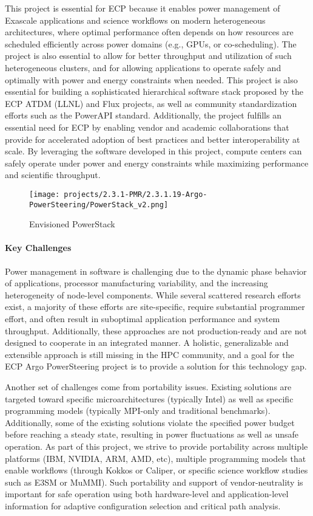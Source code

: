 This project is essential for ECP because it enables power management of Exascale applications and science workflows on modern heterogeneous architectures, where optimal performance often depends on how resources are scheduled efficiently across power domains (e.g., GPUs, or co-scheduling). The project is also essential to allow for better throughput and utilization of such heterogeneous clusters, and for allowing applications to operate safely and optimally with power and energy constraints when needed. This project is also essential for building a sophisticated hierarchical software stack proposed by the ECP ATDM (LLNL) and Flux projects, as well as community standardization efforts such as the PowerAPI standard. Additionally, the project fulfills an essential need for ECP by enabling vendor and academic collaborations that provide for accelerated adoption of best practices and better interoperability at scale. By leveraging the software developed in this project, compute centers can safely operate under power and energy constraints while maximizing performance and scientific throughput. 

\begin{figure}[t]
	\centering
	\texttt{[image: projects/2.3.1-PMR/2.3.1.19-Argo-PowerSteering/PowerStack\_v2.png]}
	\caption{Envisioned PowerStack}
	\label{fig:pstack}
\end{figure}


\paragraph{Key Challenges}
Power management in software is challenging due to the dynamic phase behavior of applications, processor manufacturing variability, and the increasing heterogeneity of node-level components. While several scattered research efforts exist, a majority of these efforts are site-specific, require substantial programmer effort, and often result in suboptimal application performance and system throughput. Additionally, these approaches are not production-ready and are not designed to cooperate in an integrated manner. A holistic, generalizable and extensible approach is still missing in the HPC community, and a goal for the ECP Argo PowerSteering project is to provide a solution for this technology gap. 

Another set of challenges come from portability issues. Existing solutions are targeted toward specific microarchitectures (typically Intel) as well as specific programming models (typically MPI-only and traditional benchmarks). Additionally, some of the existing solutions violate the specified power budget before reaching a steady state, resulting in power fluctuations as well as unsafe operation. As part of this project, we strive to provide portability across multiple platforms (IBM, NVIDIA, ARM, AMD, etc), multiple programming models that enable workflows (through Kokkos or Caliper, or specific science workflow studies such as E3SM or MuMMI). Such portability and support of vendor-neutrality is important for safe operation using both hardware-level and application-level information for adaptive configuration selection and critical path analysis.

